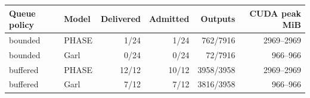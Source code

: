 \begin{tabular}{llrrrr}
\toprule
Queue policy & Model & Delivered & Admitted & Outputs & CUDA peak MiB \\
\midrule
bounded & PHASE & 1/24 & 1/24 & 762/7916 & 2969--2969 \\
bounded & Garl & 0/24 & 0/24 & 72/7916 & 966--966 \\
buffered & PHASE & 12/12 & 10/12 & 3958/3958 & 2969--2969 \\
buffered & Garl & 7/12 & 7/12 & 3816/3958 & 966--966 \\
\bottomrule
\end{tabular}
